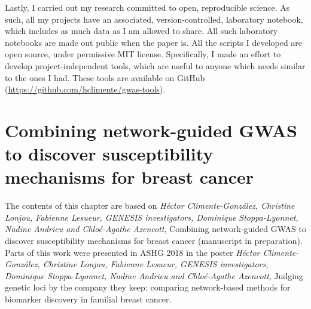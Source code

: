 \documentclass[
  11pt,
]{env/yjiao}
\begin{document}
Lastly, I carried out my research committed to open, reproducible science. As such, all my projects have an associated, version-controlled, laboratory notebook, which includes as much data as I am allowed to share. All such laboratory notebooks are made out public when the paper is. All the scripts I developed are open source, under permissive MIT license. Specifically, I made an effort to develop project-independent tools, which are useful to anyone which needs similar to the ones I had. These tools are available on GitHub (\url{https://github.com/hclimente/gwas-tools}).

\hypertarget{genesis}{%
\chapter{Combining network-guided GWAS to discover susceptibility mechanisms for breast cancer}\label{genesis}}

The contents of this chapter are based on \emph{Héctor Climente-González, Christine Lonjou, Fabienne Lesueur, GENESIS investigators, Dominique Stoppa-Lyonnet, Nadine Andrieu and Chloé-Agathe Azencott}, Combining network-guided GWAS to discover susceptibility mechanisms for breast cancer (manuscript in preparation). Parts of this work were presented in ASHG 2018 in the poster \emph{Héctor Climente-González, Christine Lonjou, Fabienne Lesueur, GENESIS investigators, Dominique Stoppa-Lyonnet, Nadine Andrieu and Chloé-Agathe Azencott}, Judging genetic loci by the company they keep: comparing network-based methods for biomarker discovery in familial breast cancer.
\end{document}
